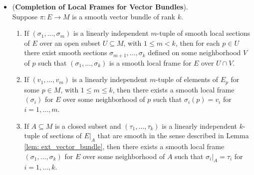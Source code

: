 \documentclass[11pt]{article}
\begin{document}
\begin{itemize}
\item \begin{proposition} (\textbf{Completion of Local Frames for Vector Bundles}). \citep{lee2003introduction} \\
Suppose $\pi: E \rightarrow M$ is a smooth vector bundle of rank $k$.
\begin{enumerate}
\item If $(\sigma_1,\ldots, \sigma_m)$ is a linearly independent $m$-tuple of smooth local sections of $E$ over an open subset $U \subseteq M$, with $1 \le m < k$, then for each $p \in U$ there exist smooth sections $\sigma_{m+1},\ldots, \sigma_{k}$ defined on some neighborhood $V$ of $p$ such that $(\sigma_1,\ldots, \sigma_k)$ is a smooth local frame for $E$ over $U \cap V$.
\item If $(v_1,\ldots,v_m)$ is a linearly independent $m$-tuple of elements of $E_p$ for some $p\in M$, with $1 \le m \le k$, then there exists a smooth local frame $(\sigma_i)$ for $E$ over some neighborhood of $p$ such that $\sigma_i(p) = v_i$ for $i = 1,\ldots,m$.
\item If $A \subseteq M$ is a closed subset and $(\tau_1,\ldots, \tau_k)$ is a linearly independent $k$-tuple of sections of $E|_{A}$ that are smooth in the sense described in Lemma  \ref{lem: ext_vector_bundle}, then there exists a smooth local frame $(\sigma_1,\ldots, \sigma_k)$ for $E$ over some neighborhood of $A$ such that $\sigma_i|_{A} = \tau_i$ for $i = 1,\ldots,k$.
\end{enumerate}
\end{proposition}




\end{itemize}
\end{document}
